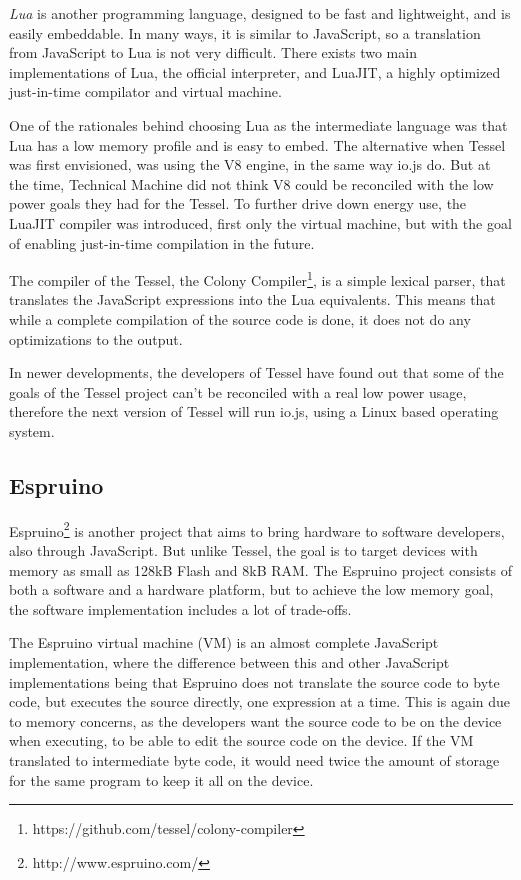 \emph{Lua} is another programming language, designed to be fast and lightweight, and is easily embeddable. In many ways, it is similar to JavaScript, so a translation from JavaScript to Lua is not very difficult. There exists two main implementations of Lua, the official interpreter, and LuaJIT, a highly optimized just-in-time compilator and virtual machine.

One of the rationales behind choosing Lua as the intermediate language was that Lua has a low memory profile and is easy to embed.
The alternative when Tessel was first envisioned, was using the V8 engine, in the same way io.js do.
But at the time, Technical Machine did not think V8 could be reconciled with the low power goals they had for the Tessel.
To further drive down energy use, the LuaJIT compiler was introduced, first only the virtual machine, but with the goal of enabling just-in-time compilation in the future. 

The compiler of the Tessel, the Colony Compiler\footnote{https://github.com/tessel/colony-compiler}, is a simple lexical parser, that translates the JavaScript expressions into the Lua equivalents.
This means that while a complete compilation of the source code is done, it does not do any optimizations to the output.

In newer developments, the developers of Tessel have found out that some of the goals of the Tessel project can’t be reconciled with a real low power usage, therefore the next version of Tessel will run io.js, using a Linux based operating system.

\subsection{Espruino}
Espruino\footnote{http://www.espruino.com/} is another project that aims to bring hardware to software developers, also through JavaScript.
But unlike Tessel, the goal is to target devices with memory as small as 128kB Flash and 8kB RAM.
The Espruino project consists of both a software and a hardware platform, but to achieve the low memory goal, the software implementation includes a lot of trade-offs.

The Espruino virtual machine (VM) is an almost complete JavaScript implementation, where the difference between this and other JavaScript implementations being that Espruino does not translate the source code to byte code, but executes the source directly, one expression at a time.
This is again due to memory concerns, as the developers want the source code to be on the device when executing, to be able to edit the source code on the device. 
If the VM translated to intermediate byte code, it would need twice the amount of storage for the same program to keep it all on the device.

